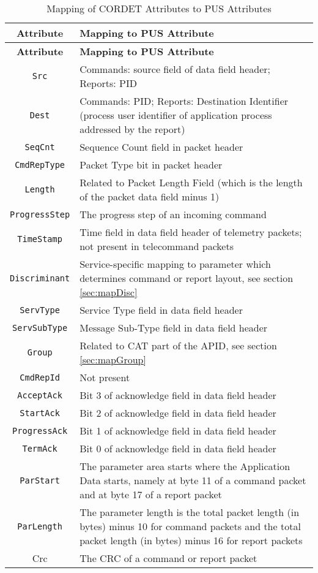 \documentclass{pnp_article}
\begin{document}
\begin{longtable}{|c|>{\raggedright\arraybackslash}p{11cm}|}
\caption{Mapping of CORDET Attributes to PUS Attributes}\label{tab:pcktAttPus} \\
\hline
\rowcolor{light-gray}
\textbf{Attribute} & \textbf{Mapping to PUS Attribute} \\
\hline\hline
\endfirsthead
\rowcolor{light-gray}
\textbf{Attribute} & \textbf{Mapping to PUS Attribute} \\
\hline\hline
\endhead
\texttt{Src} & Commands: source field of data field header; Reports: PID \\
\hline
\texttt{Dest} & Commands: PID; Reports: Destination Identifier (process user identifier of application process addressed by the report)  \\
\hline
\texttt{SeqCnt} & Sequence Count field in packet header \\
\hline
\texttt{CmdRepType} & Packet Type bit in packet header \\
\hline
\texttt{Length} & Related to Packet Length Field (which is the length of the packet data field minus 1) \\
\hline
\texttt{ProgressStep} & The progress step of an incoming command \\
\hline
\texttt{TimeStamp} & Time field in data field header of telemetry packets; not present in telecommand packets \\
\hline
\texttt{Discriminant} & Service-specific mapping to parameter which determines command or report layout, see section \ref{sec:mapDisc} \\
\hline
\texttt{ServType} & Service Type field in data field header \\
\hline
\texttt{ServSubType} & Message Sub-Type field in data field header \\
\hline
\texttt{Group} & Related to CAT part of the APID, see section \ref{sec:mapGroup} \\
\hline
\texttt{CmdRepId} & Not present \\
\hline
\texttt{AcceptAck} & Bit 3 of acknowledge field in data field header \\
\hline
\texttt{StartAck} & Bit 2 of acknowledge field in data field header \\
\hline
\texttt{ProgressAck} & Bit 1 of acknowledge field in data field header \\
\hline
\texttt{TermAck} & Bit 0 of acknowledge field in data field header \\
\hline
\texttt{ParStart} & The parameter area starts where the Application Data starts, namely at byte 11 of a command packet and at byte 17 of a report packet \\
\hline
\texttt{ParLength} & The parameter length is the total packet length (in bytes) minus 10 for command packets and the total packet length (in bytes) minus 16 for report packets \\
\hline
Crc & The CRC of a command or report packet \\
\hline
\end{longtable}  
\end{document}
